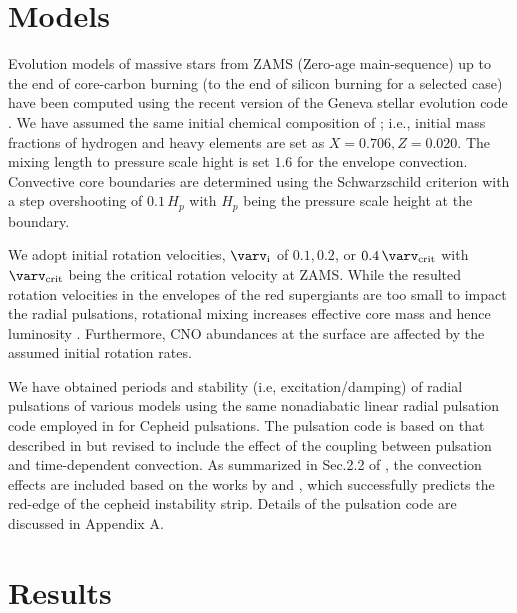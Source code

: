 \documentclass[fleqn,usenatbib]{mnras}
\begin{document}
\section{Models}

Evolution models of massive stars from ZAMS (Zero-age main-sequence) 
up to the end of core-carbon burning (to the end of silicon burning for a 
selected case) have been computed using the recent version of 
the Geneva stellar evolution code \citep[GENEC:][]{Ekstroem2012,Yusof2022}.  
We have assumed the same initial chemical composition of \citet{Yusof2022}; 
i.e., initial mass fractions of hydrogen and heavy elements 
are set as $X=0.706,Z=0.020$.
The mixing length to pressure scale hight is set $1.6$ for the envelope convection.
Convective core boundaries are determined using the Schwarzschild criterion 
with a step overshooting of $0.1\,H_p$ with $H_p$ being the pressure scale height 
at the boundary.

We adopt initial rotation velocities, $\varv_{\rm i}$ of $0.1, 0.2$, or 
$0.4\,\varv_{\rm crit}$ with $\varv_{\rm crit}$ being the critical rotation 
 velocity at ZAMS.
While the resulted rotation velocities in the envelopes of the red supergiants 
are too small to impact the radial pulsations, rotational mixing 
increases effective core mass and hence luminosity \citep{Ekstroem2012,Yusof2022}. 
Furthermore, CNO abundances at the surface are affected by 
the assumed initial rotation rates.  

We have obtained periods and stability (i.e, excitation/damping) of radial 
pulsations of various models using the same nonadiabatic linear radial pulsation 
code employed in \citet{Anderson2016} for Cepheid pulsations.
The pulsation code is based on that described in \citet{Saio1983} but revised
to include the effect of the coupling between pulsation and time-dependent convection. 
As summarized in Sec.2.2 of \citet{Anderson2016}, the convection effects 
are included based on the works by \citet{Unno1967} and \citet{Liege2005}, 
which successfully predicts the red-edge of the cepheid instability strip.
Details of the pulsation code are discussed in Appendix A. 

\section{Results}
\end{document}
